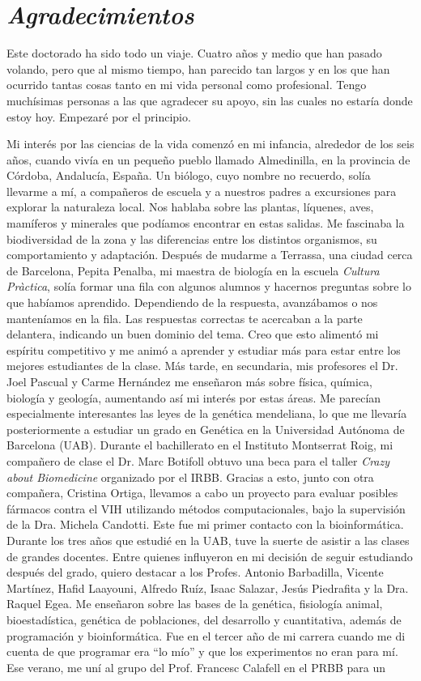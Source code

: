 \chapter*{\textit{Agradecimientos}} %

Este doctorado ha sido todo un viaje. Cuatro años y medio que han pasado volando, pero que al mismo tiempo, han parecido tan largos y en los que han ocurrido tantas cosas tanto en mi vida personal como profesional. Tengo muchísimas personas a las que agradecer su apoyo, sin las cuales no estaría donde estoy hoy. Empezaré por el principio.

Mi interés por las ciencias de la vida comenzó en mi infancia, alrededor de los seis años, cuando vivía en un pequeño pueblo llamado Almedinilla, en la provincia de Córdoba, Andalucía, España. Un biólogo, cuyo nombre no recuerdo, solía llevarme a mí, a compañeros de escuela y a nuestros padres a excursiones para explorar la naturaleza local. Nos hablaba sobre las plantas, líquenes, aves, mamíferos y minerales que podíamos encontrar en estas salidas. Me fascinaba la biodiversidad de la zona y las diferencias entre los distintos organismos, su comportamiento y adaptación. Después de mudarme a Terrassa, una ciudad cerca de Barcelona, Pepita Penalba, mi maestra de biología en la escuela \textit{Cultura Pràctica}, solía formar una fila con algunos alumnos y hacernos preguntas sobre lo que habíamos aprendido. Dependiendo de la respuesta, avanzábamos o nos manteníamos en la fila. Las respuestas correctas te acercaban a la parte delantera, indicando un buen dominio del tema. Creo que esto alimentó mi espíritu competitivo y me animó a aprender y estudiar más para estar entre los mejores estudiantes de la clase. Más tarde, en secundaria, mis profesores el Dr. Joel Pascual y Carme Hernández me enseñaron más sobre física, química, biología y geología, aumentando así mi interés por estas áreas. Me parecían especialmente interesantes las leyes de la genética mendeliana, lo que me llevaría posteriormente a estudiar un grado en Genética en la Universidad Autónoma de Barcelona (UAB). Durante el bachillerato en el Instituto Montserrat Roig, mi compañero de clase el Dr. Marc Botifoll obtuvo una beca para el taller \textit{Crazy about Biomedicine} organizado por el IRBB. Gracias a esto, junto con otra compañera, Cristina Ortiga, llevamos a cabo un proyecto para evaluar posibles fármacos contra el VIH utilizando métodos computacionales, bajo la supervisión de la Dra. Michela Candotti. Este fue mi primer contacto con la bioinformática. Durante los tres años que estudié en la UAB, tuve la suerte de asistir a las clases de grandes docentes. Entre quienes influyeron en mi decisión de seguir estudiando después del grado, quiero destacar a los Profes. Antonio Barbadilla, Vicente Martínez, Hafid Laayouni, Alfredo Ruíz, Isaac Salazar, Jesús Piedrafita y la Dra. Raquel Egea. Me enseñaron sobre las bases de la genética, fisiología animal, bioestadística, genética de poblaciones, del desarrollo y cuantitativa, además de programación y bioinformática. Fue en el tercer año de mi carrera cuando me di cuenta de que programar era ``lo mío'' y que los experimentos no eran para mí. Ese verano, me uní al grupo del Prof. Francesc Calafell en el PRBB para un 